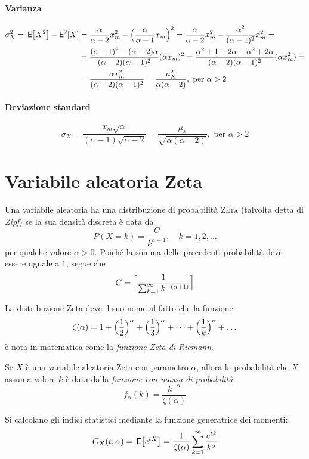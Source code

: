 \paragraph{Varianza}
\[\begin{split}
	\sigma_X^2 = \,{\operatorname{\mathsf{E}}}\!\left[{X^2}\right] - \operatorname{\mathsf{E}}^2[X] &=
		\frac{\alpha}{\alpha -2} x_m^2 - \Bigl(\frac{\alpha}{\alpha -1} x_m\Bigr)^2 =
		\frac{\alpha}{\alpha -2} x_m^2 - \frac{\alpha^2}{(\alpha - 1)^2} x_m^2 = \\
	&= \frac{(\alpha -1)^2 - (\alpha -2)\alpha}{(\alpha -2)(\alpha -1)^2}(\alpha x_m)^2 =
		\frac{\alpha^2 +1 -2\alpha -\alpha^2 +2\alpha}{(\alpha -2)(\alpha -1)^2} (\alpha x_m^2) = \\
	& = \frac{\alpha x_m^2}{(\alpha -2)(\alpha -1)^2} = \frac{\mu_X^2}{\alpha (\alpha -2)}, \text{ per } \alpha > 2
\end{split}\]

\paragraph{Deviazione standard}
\[
	\sigma_X = \frac{x_m \sqrt{\alpha}}{(\alpha -1) \sqrt{\alpha -2}} = \frac{\mu_x}{\sqrt{\alpha (\alpha -2)}}, \text{ per } \alpha > 2
\]

\section{Variabile aleatoria Zeta}
Una variabile aleatoria ha una distribuzione di probabilità \textsc{Zeta}
(talvolta detta di \emph{Zipf}) se la sua densità discreta è data da
\[
	P(X = k) = \frac{C}{k^{\alpha+1}},
	\quad k=1,2,\dots
\]
per qualche valore \(\alpha > 0\). Poiché la somma delle precedenti probabilità
deve essere uguale a \(1\), segue che
\[
	C = \Bigl[ \frac{1}{\sum_{k=1}^{\infty} k^{-(\alpha+1)}} \Bigr]
\]

La distribuzione Zeta deve il suo nome al fatto che la funzione
\[
	\zeta(\alpha) = 1 + \Bigl(\frac{1}{2}\Bigr)^\alpha + \Bigl(\frac{1}{3}\Bigr)^\alpha + \dots + \Bigl(\frac{1}{k}\Bigr)^\alpha + \dots
\]
è nota in matematica come la \emph{funzione Zeta di Riemann}.

Se \(X\) è una variabile aleatoria Zeta con parametro \(\alpha\), allora la probabilità
che \(X\) assuma valore \(k\) è data dalla \emph{funzione con massa di probabilità}
\[
	f_\alpha(k) = \frac{k^{-\alpha}}{\zeta(\alpha)}
\]

Si calcolano gli indici statistici mediante la funzione generatrice dei momenti:
\[
	G_X(t;\alpha) = \,{\operatorname{\mathsf{E}}}\!\left[{e^{tX}}\right] = \frac{1}{\zeta(\alpha)} \sum_{k=1}^\infty \frac{e^{tk}}{k^{\alpha}}
\]

